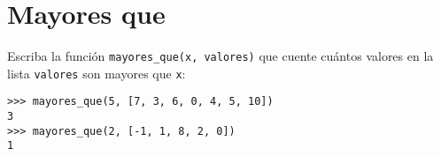 \section{Mayores que}

Escriba la función \lstinline!mayores_que(x, valores)! que cuente
cuántos va\-lo\-res en la lista \lstinline!valores! son mayores que
\lstinline!x!:

\begin{lstlisting}
>>> mayores_que(5, [7, 3, 6, 0, 4, 5, 10])
3
>>> mayores_que(2, [-1, 1, 8, 2, 0])
1
\end{lstlisting}

